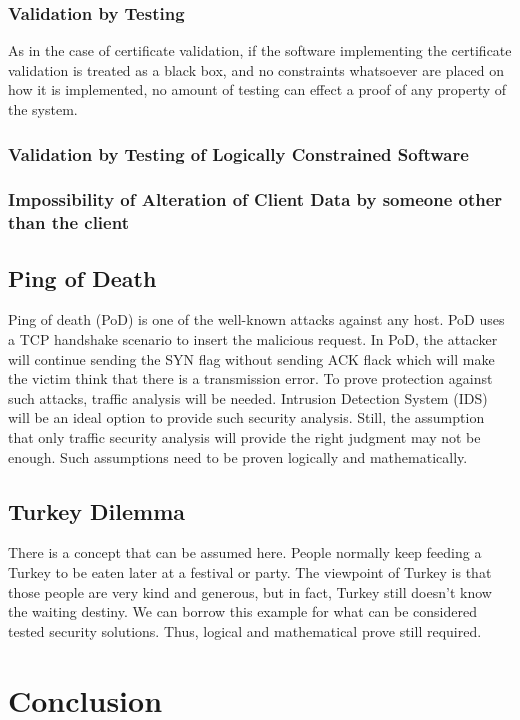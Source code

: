 \documentclass[journal]{IEEEtran}
\begin{document}
\subsubsection{Validation by Testing}

As in the case of certificate validation,
if the software implementing the certificate validation is treated
as a black box, and no constraints whatsoever are placed on how it is
implemented, no amount of testing can effect a proof of any
property of the system.

\subsubsection{Validation by Testing of Logically Constrained Software}

\subsubsection{Impossibility of Alteration of Client Data by someone other than the client}

\subsection{Ping of Death}
Ping of death (PoD) is one of the well-known attacks against any host. PoD uses a TCP handshake
scenario to insert the malicious request. In PoD, the attacker will continue sending the SYN flag
without sending ACK flack which will make the victim think that there is a transmission error. To
prove protection against such attacks, traffic analysis will be needed. Intrusion Detection System
(IDS) will be an ideal option to provide such security analysis. Still, the assumption that only
traffic security analysis will provide the right judgment may not be enough. Such assumptions need
to be proven logically and mathematically.


\subsection{Turkey Dilemma}
There is a concept that can be assumed here. People normally keep feeding a Turkey to be eaten later at
a festival or party. The viewpoint of Turkey is that those people are very kind and generous, but in fact,
Turkey still doesn't know the waiting destiny. We can borrow this example for what can be considered tested
security solutions. Thus, logical and mathematical prove still required.
\section{Conclusion}





\end{document}

